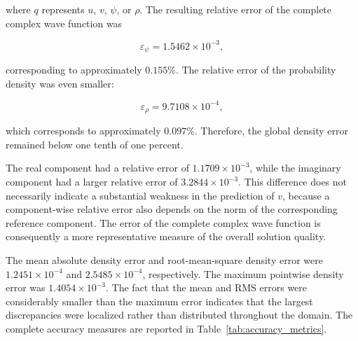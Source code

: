 \documentclass[11pt]{article}
\begin{document}
where \(q\) represents \(u\), \(v\), \(\psi\), or \(\rho\). The resulting relative error of the complete complex wave function was

\begin{equation}
	\varepsilon_{\psi}
	=
	1.5462\times10^{-3},
\end{equation}

corresponding to approximately \(0.155\%\). The relative error of the probability density was even smaller:

\begin{equation}
	\varepsilon_{\rho}
	=
	9.7108\times10^{-4},
\end{equation}

which corresponds to approximately \(0.097\%\). Therefore, the global density error remained below one tenth of one percent.

The real component had a relative error of \(1.1709\times10^{-3}\), while the imaginary component had a 
larger relative error of \(3.2844\times10^{-3}\). This difference does not necessarily 
indicate a substantial weakness in the prediction of \(v\), because a component-wise 
relative error also depends on the norm of the corresponding reference component. 
The error of the complete complex wave function is consequently a more representative 
measure of the overall solution quality.

The mean absolute density error and 
root-mean-square density error were \(1.2451\times10^{-4}\) and \(2.5485\times10^{-4}\), 
respectively. The maximum pointwise density error was \(1.4054\times10^{-3}\). The fact 
that the mean and RMS errors were considerably smaller than the maximum error indicates that the 
largest discrepancies were localized rather than distributed throughout the domain. The complete 
accuracy measures are reported in Table~\ref{tab:accuracy_metrics}.
\end{document}
